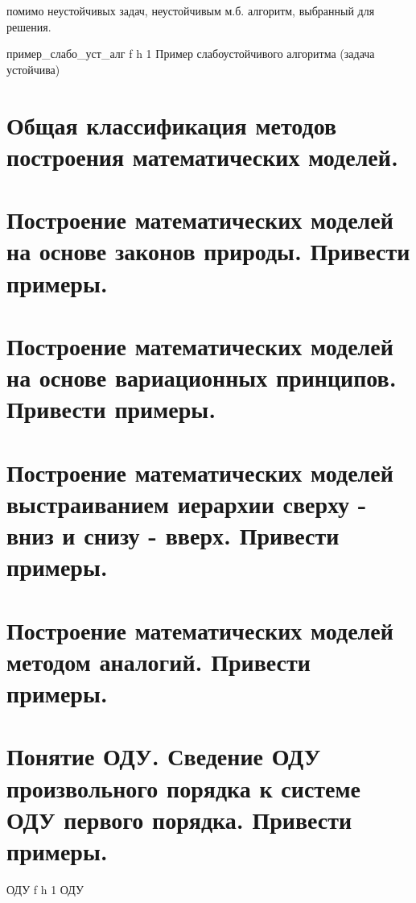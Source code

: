 помимо неустойчивых задач, неустойчивым м.б. алгоритм, выбранный для решения.

{пример_слабо_уст_алг} %
{f} %
{h} %
{1\textwidth} %
{Пример слабоустойчивого алгоритма (задача устойчива)}

\clearpage

\section*{Общая классификация методов построения математических моделей.} 


\section*{ Построение математических моделей на основе законов природы. Привести примеры.} 


\section*{Построение математических моделей на основе вариационных принципов. Привести примеры.} 


\section*{Построение математических моделей выстраиванием иерархии сверху - вниз и снизу - вверх. Привести примеры.} 


\section*{Построение математических моделей методом аналогий. Привести примеры.} 


\section*{Понятие ОДУ. Сведение ОДУ произвольного порядка к системе ОДУ первого порядка. Привести примеры.} %

{ОДУ} %
{f} %
{h} %
{1\textwidth} %
{ОДУ}

